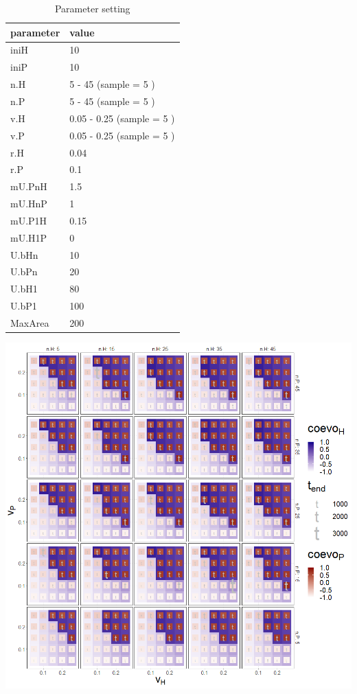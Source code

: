 \documentclass[
]{book}
\begin{document}
\begin{table}[!h]

\caption{\label{tab:4nvtablepdf}Parameter setting}
\centering
\begin{tabular}[t]{l|l}
\hline
parameter & value\\
\hline
iniH & 10\\
\hline
iniP & 10\\
\hline
n.H & 5 - 45 (sample = 5 )\\
\hline
n.P & 5 - 45 (sample = 5 )\\
\hline
v.H & 0.05 - 0.25 (sample = 5 )\\
\hline
v.P & 0.05 - 0.25 (sample = 5 )\\
\hline
r.H & 0.04\\
\hline
r.P & 0.1\\
\hline
mU.PnH & 1.5\\
\hline
mU.HnP & 1\\
\hline
mU.P1H & 0.15\\
\hline
mU.H1P & 0\\
\hline
U.bHn & 10\\
\hline
U.bPn & 20\\
\hline
U.bH1 & 80\\
\hline
U.bP1 & 100\\
\hline
MaxArea & 200\\
\hline
\end{tabular}
\end{table}

\newpage

\includegraphics[width=1\linewidth]{plots/4_fourPar-n-v_plot}
\end{document}
